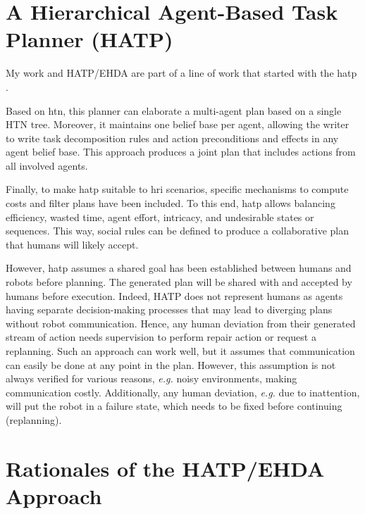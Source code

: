 \section{A Hierarchical Agent-Based Task Planner (HATP)}

My work and HATP/EHDA are part of a line of work that started with the \acrfull{hatp} \cite{alili2009task,lallement2014hatp}.

Based on \acrfull{htn}, this planner can elaborate a multi-agent plan based on a single HTN tree. Moreover, it maintains one belief base per agent, allowing the writer to write task decomposition rules and action preconditions and effects in any agent belief base. This approach produces a joint plan that includes actions from all involved agents. 

Finally, to make \acrshort{hatp} suitable to \acrshort{hri} scenarios, specific mechanisms to compute costs and filter plans have been included. To this end, \acrshort{hatp} allows balancing efficiency, wasted time, agent effort, intricacy, and undesirable states or sequences. This way, social rules can be defined to produce a collaborative plan that humans will likely accept. 

However, \acrshort{hatp} assumes a shared goal has been established between humans and robots before planning. The generated plan will be shared with and accepted by humans before execution. Indeed, HATP does not represent humans as agents having separate decision-making processes that may lead to diverging plans without robot communication. Hence, any human deviation from their generated stream of action needs supervision to perform repair action or request a replanning. Such an approach can work well, but it assumes that communication can easily be done at any point in the plan. However, this assumption is not always verified for various reasons, \textit{e.g.} noisy environments, making communication costly.
Additionally, any human deviation, \textit{e.g.} due to inattention, will put the robot in a failure state, which needs to be fixed before continuing (replanning).

\section{Rationales of the HATP/EHDA Approach}

